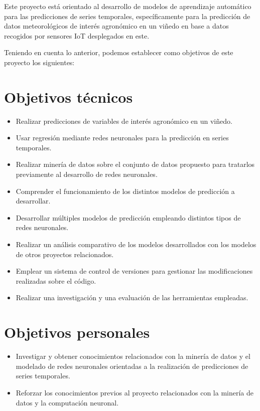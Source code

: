 

Este proyecto está orientado al desarrollo de modelos de aprendizaje automático para las predicciones de series temporales, específicamente para la predicción de datos meteorológicos de interés agronómico en un viñedo en base a datos recogidos por sensores IoT desplegados en este.

\par

Teniendo en cuenta lo anterior, podemos establecer como objetivos de este proyecto los siguientes:

\section{Objetivos técnicos}

\begin{itemize}
    \item Realizar predicciones de variables de interés agronómico en un viñedo.
    \item Usar regresión mediante redes neuronales para la predicción en series temporales.
    \item Realizar minería de datos sobre el conjunto de datos propuesto para tratarlos previamente al desarrollo de redes neuronales.
    \item Comprender el funcionamiento de los distintos modelos de predicción a desarrollar.
    \item Desarrollar múltiples modelos de predicción empleando distintos tipos de redes neuronales.
    \item Realizar un análisis comparativo de los modelos desarrollados con los modelos de otros proyectos relacionados.
    \item Emplear un sistema de control de versiones para gestionar las modificaciones realizadas sobre el código.
    \item Realizar una investigación y una evaluación de las herramientas empleadas.
\end{itemize}

\section{Objetivos personales}

\begin{itemize}
    \item Investigar y obtener conocimientos relacionados con la minería de datos y el modelado de redes neuronales orientadas a la realización de predicciones de series temporales.
    \item Reforzar los conocimientos previos al proyecto relacionados con la minería de datos y la computación neuronal.
\end{itemize}